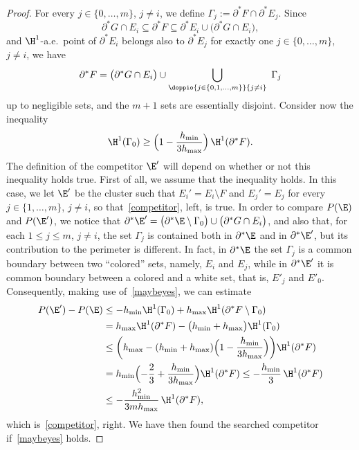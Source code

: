 \begin{proof}
For every $j\in\{0,\dots,m\}$, $j\neq i$, we define $\Gamma_j := \partial^* F \cap \partial^* E_j$. Since
\[
\partial^* G\cap E_i\subseteq \partial^* F\subseteq \partial^* E_i \cup \big(\partial^* G\cap E_i\big),
\]
and $\H^1$-a.e.\ point of $\partial^* E_i$ belongs also to $\partial^* E_j$ for exactly one $j\in\{0,\dots,m\}$, $j\neq i$, we have
\begin{equation}\label{subdiv}
\partial^* F =\big(\partial^* G \cap E_i\big)\cup \bigcup_{\doppio{j\in \{0,1,\dots,m\}}{j\neq i}}\ \Gamma_j
\end{equation}
up to negligible sets, and the $m+1$ sets are essentially disjoint. Consider now the inequality
\begin{equation}\label{maybeyes}
\H^1(\Gamma_0)\geq \Bigl(1-\frac{h_{\min}}{3h_{\max}}\Bigr)\, \H^1(\partial^* F).
\end{equation}
The definition of the competitor $\E'$ will depend on whether or not this inequality holds true. First of all, we assume that the inequality holds. In this case, we let $\E'$ be the cluster such that $E_i'=E_i\setminus F$ and $E_j'=E_j$ for every $j\in\{1,\dots,m\}$, $j\neq i$, so that~\eqref{competitor}, left, is true. In order to compare $P(\E)$ and $P(\E')$, we notice that $\partial^* \E' = \big(\partial^* \E \setminus \Gamma_0\big) \cup \big(\partial^* G\cap E_i\big)$, and also that, for each $1\leq j\leq m$, $j\neq i$, the set $\Gamma_j$ is contained both in $\partial^*\E$ and in $\partial^* \E'$, but its contribution to the perimeter is different. In fact, in $\partial^*\E$ the set $\Gamma_j$ is a common boundary between two ``colored'' sets, namely, $E_i$ and $E_j$, while in $\partial^*\E'$ it is common boundary between a colored and a white set, that is, $E'_j$ and $E'_0$. Consequently, making use of~\eqref{maybeyes}, we can estimate
\[\begin{split}
P(\E')- P(\E)&\leq - h_{\min} \H^1(\Gamma_0) + h_{\max} \H^1(\partial^* F\setminus \Gamma_0)\\
&= h_{\max}\H^1(\partial^* F) - \big(h_{\min}+h_{\max}\big) \H^1(\Gamma_0)\\
&\leq \bigg(h_{\max} - (h_{\min}+h_{\max})\Bigl(1-\frac{h_{\min}}{3h_{\max}}\Bigr)\bigg)\H^1(\partial^* F)\\
&= h_{\min}\Bigl(-\frac 23 + \frac{h_{\min}}{3h_{\max}}\Bigr)\H^1(\partial^* F)
\leq - \frac{h_{\min}}3\, \H^1(\partial^* F)\\
&\leq - \frac{h_{\min}^2}{3mh_{\max}}\, \H^1(\partial^* F),
\end{split}\]
which is~\eqref{competitor}, right. We have then found the searched competitor if~\eqref{maybeyes} holds.


\end{proof}
